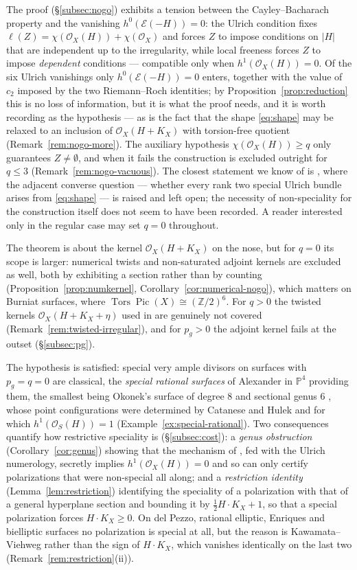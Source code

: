 \documentclass[10pt,a4paper]{amsart}
\newcommand{\OO}{\mathcal{O}}
\newcommand{\EE}{\mathcal{E}}
\newcommand{\PP}{\mathbb{P}}
\newcommand{\ZZ}{\mathbb{Z}}
\newcommand{\Pic}{\operatorname{Pic}}
\newcommand{\len}{\ell}
\begin{document}
The proof (\S\ref{subsec:nogo}) exhibits a tension between the Cayley--Bacharach property and the vanishing $h^0(\EE(-H))=0$: the Ulrich condition fixes $\len(Z)=\chi(\OO_X(H))+\chi(\OO_X)$ and forces $Z$ to impose conditions on $|H|$ that are independent up to the irregularity, while local freeness forces $Z$ to impose \emph{dependent} conditions --- compatible only when $h^1(\OO_X(H))=0$. Of the six Ulrich vanishings only $h^0(\EE(-H))=0$ enters, together with the value of $c_2$ imposed by the two Riemann--Roch identities; by Proposition~\ref{prop:reduction} this is no loss of information, but it is what the proof needs, and it is worth recording as the hypothesis --- as is the fact that the shape \eqref{eq:shape} may be relaxed to an inclusion of $\OO_X(H+K_X)$ with torsion-free quotient (Remark~\ref{rem:nogo-more}). The auxiliary hypothesis $\chi(\OO_X(H))\ge q$ only guarantees $Z\neq\emptyset$, and when it fails the construction is excluded outright for $q\le3$ (Remark~\ref{rem:nogo-vacuous}). The closest statement we know of is \cite[Rem.~3.4]{Cas17}, where the adjacent converse question --- whether every rank two special Ulrich bundle arises from \eqref{eq:shape} --- is raised and left open; the necessity of non-speciality for the construction itself does not seem to have been recorded. A reader interested only in the regular case may set $q=0$ throughout.

The theorem is about the kernel $\OO_X(H+K_X)$ on the nose, but for $q=0$ its scope is larger: numerical twists and non-saturated adjoint kernels are excluded as well, both by exhibiting a section rather than by counting (Proposition~\ref{prop:numkernel}, Corollary~\ref{cor:numerical-nogo}), which matters on Burniat surfaces, where $\operatorname{Tors}\Pic(X)\cong(\ZZ/2)^6$. For $q>0$ the twisted kernels $\OO_X(H+K_X+\eta)$ used in \cite{Cas19} are genuinely not covered (Remark~\ref{rem:twisted-irregular}), and for $p_g>0$ the adjoint kernel fails at the outset (\S\ref{subsec:pg}).

The hypothesis is satisfied: special very ample divisors on surfaces with $p_g=q=0$ are classical, the \emph{special rational surfaces} of Alexander in $\PP^4$ \cite{Al88,Al92} providing them, the smallest being Okonek's surface of degree $8$ and sectional genus $6$ \cite{Ok86}, whose point configurations were determined by Catanese and Hulek \cite{CH97} and for which $h^1(\OO_S(H))=1$ (Example~\ref{ex:special-rational}). Two consequences quantify how restrictive speciality is (\S\ref{subsec:cost}): a \emph{genus obstruction} (Corollary~\ref{cor:genus}) showing that the mechanism of \cite{An94}, fed with the Ulrich numerology, secretly implies $h^1(\OO_X(H))=0$ and so can only certify polarizations that were non-special all along; and a \emph{restriction identity} (Lemma~\ref{lem:restriction}) identifying the speciality of a polarization with that of a general hyperplane section and bounding it by $\tfrac12H\cdot K_X+1$, so that a special polarization forces $H\cdot K_X\ge0$. On del Pezzo, rational elliptic, Enriques and bielliptic surfaces no polarization is special at all, but the reason is Kawamata--Viehweg rather than the sign of $H\cdot K_X$, which vanishes identically on the last two (Remark~\ref{rem:restriction}(ii)).
\end{document}

